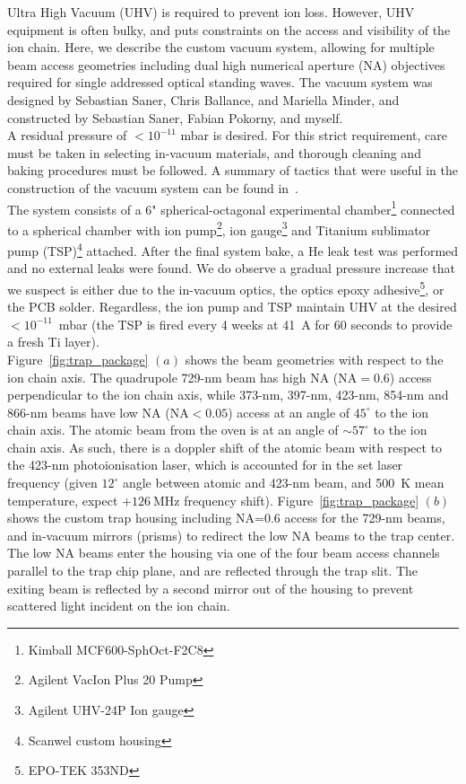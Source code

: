     Ultra High Vacuum (UHV) is required to prevent ion loss.
    However, UHV equipment is often bulky, and puts constraints on the access
    and visibility of the ion chain. Here, we describe the custom vacuum
    system, allowing for multiple beam access geometries including dual high numerical aperture (NA) objectives required for single addressed optical standing waves.  The vacuum system was
    designed by Sebastian Saner, Chris Ballance, and Mariella Minder, and constructed by
    Sebastian Saner, Fabian Pokorny, and myself.\\
    A residual pressure of $<10^{-11}$ mbar is desired. For this strict
    requirement, care must be taken in selecting in-vacuum materials, and 
    thorough cleaning and baking procedures must be followed. A summary of tactics that were
    useful in the construction of the vacuum system can be found
    in~\cite{birnbaum_ultra-high_nodate, wolf_cryogenic_2019}.\\
    The system consists of a 6" spherical-octagonal
    experimental chamber\footnote{Kimball MCF600-SphOct-F2C8} connected to a
    spherical chamber with ion pump\footnote{Agilent VacIon Plus 20 Pump}, ion
    gauge\footnote{Agilent UHV-24P Ion gauge} and Titanium sublimator pump
    (TSP)\footnote{Scanwel custom housing} attached. 
    After the final system bake, a He leak test was performed and 
    no external leaks were found. We do observe a gradual pressure increase that we suspect is either due
    to the in-vacuum optics, the optics epoxy adhesive\footnote{EPO-TEK
    353ND}, or the PCB solder. Regardless, the ion pump and TSP
    maintain UHV at the desired $<10^{-11}$~mbar (the TSP
    is fired every 4 weeks at 41~A for 60 seconds to provide a fresh Ti layer).\\
    Figure~\ref{fig:trap_package} $(a)$ shows the beam geometries with respect
    to the ion chain axis. The quadrupole 729-nm beam has high NA ($\mathrm{NA}=0.6$) access
    perpendicular to the ion chain axis, while 373-nm, 397-nm, 423-nm, 854-nm and 866-nm
    beams have low NA ($\mathrm{NA}<0.05$) access at an angle of $45^{\circ}$ to the ion chain axis.
    The atomic beam from the oven is at an angle of $\sim 57^{\circ}$ to the ion
    chain axis. As such, there is a doppler shift of the atomic beam with
    respect to the 423-nm photoionisation laser, which is accounted for in the
    set laser frequency (given $12^\circ$ angle between atomic and 423-nm
    beam, and 500~K mean temperature, expect $+126~\unit{\mega\hertz}$ frequency
    shift). Figure~\ref{fig:trap_package} $(b)$ shows the custom trap housing including NA=0.6 access for the 729-nm beams, and in-vacuum mirrors (prisms) to redirect the low NA beams to the trap center. The low NA beams enter the housing via one of the four beam access channels parallel to the trap chip plane, and are reflected through the trap slit. The exiting beam is reflected by a second mirror out of the housing to prevent scattered light incident on the ion chain.
